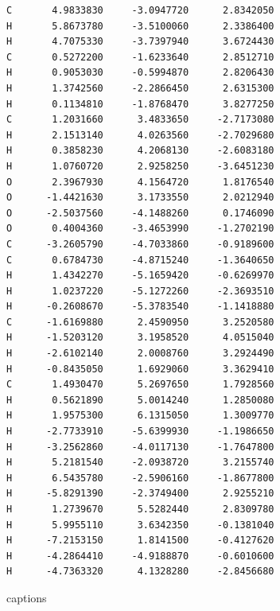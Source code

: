 \documentclass[
digital, %
table,   %
nolof,     %
nolot,     %
oneside,
]{fithesis3}
\begin{document}
\begin{lstlisting}[frame=single, caption={puvodni struktura C trans },label=DescriptiveLabel]
C       4.9833830     -3.0947720      2.8342050
H       5.8673780     -3.5100060      2.3386400
H       4.7075330     -3.7397940      3.6724430
C       0.5272200     -1.6233640      2.8512710
H       0.9053030     -0.5994870      2.8206430
H       1.3742560     -2.2866450      2.6315300
H       0.1134810     -1.8768470      3.8277250
C       1.2031660      3.4833650     -2.7173080
H       2.1513140      4.0263560     -2.7029680
H       0.3858230      4.2068130     -2.6083180
H       1.0760720      2.9258250     -3.6451230
O       2.3967930      4.1564720      1.8176540
O      -1.4421630      3.1733550      2.0212940
O      -2.5037560     -4.1488260      0.1746090
O       0.4004360     -3.4653990     -1.2702190
C      -3.2605790     -4.7033860     -0.9189600
C       0.6784730     -4.8715240     -1.3640650
H       1.4342270     -5.1659420     -0.6269970
H       1.0237220     -5.1272260     -2.3693510
H      -0.2608670     -5.3783540     -1.1418880
C      -1.6169880      2.4590950      3.2520580
H      -1.5203120      3.1958520      4.0515040
H      -2.6102140      2.0008760      3.2924490
H      -0.8435050      1.6929060      3.3629410
C       1.4930470      5.2697650      1.7928560
H       0.5621890      5.0014240      1.2850080
H       1.9575300      6.1315050      1.3009770
H      -2.7733910     -5.6399930     -1.1986650
H      -3.2562860     -4.0117130     -1.7647800
H       5.2181540     -2.0938720      3.2155740
H       6.5435780     -2.5906160     -1.8677800
H      -5.8291390     -2.3749400      2.9255210
H       1.2739670      5.5282440      2.8309780
H       5.9955110      3.6342350     -0.1381040
H      -7.2153150      1.8141500     -0.4127620
H      -4.2864410     -4.9188870     -0.6010600
H      -4.7363320      4.1328280     -2.8456680

\end{lstlisting}


{\csname captions\languagename\endcsname %
\makeatletter %
\thesis@selectLocale{\thesis@locale}\makeatother
\printbibliography[heading=bibintoc]} %
\end{document}
